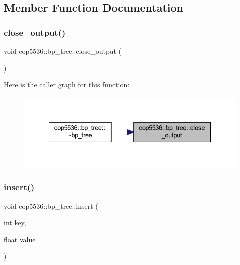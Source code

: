 \subsection{Member Function Documentation}
\mbox{\label{classcop5536_1_1bp__tree_ada822d6bb72e15c4ba6f9c2848fb883c}} 
\subsubsection{close\_output()}
{\footnotesize\ttfamily void cop5536\+::bp\+\_\+tree\+::close\+\_\+output (\begin{DoxyParamCaption}{ }\end{DoxyParamCaption})\hspace{0.3cm}{\ttfamily [inline]}}

Here is the caller graph for this function\+:
\nopagebreak
\begin{figure}[H]
\begin{center}
\leavevmode
\includegraphics[width=335pt]{classcop5536_1_1bp__tree_ada822d6bb72e15c4ba6f9c2848fb883c_icgraph}
\end{center}
\end{figure}
\mbox{\label{classcop5536_1_1bp__tree_a244ebb31e046d28bc2a765d1215c98ac}} 
\subsubsection{insert()}
{\footnotesize\ttfamily void cop5536\+::bp\+\_\+tree\+::insert (\begin{DoxyParamCaption}\item[{int}]{key,  }\item[{float}]{value }\end{DoxyParamCaption})}

